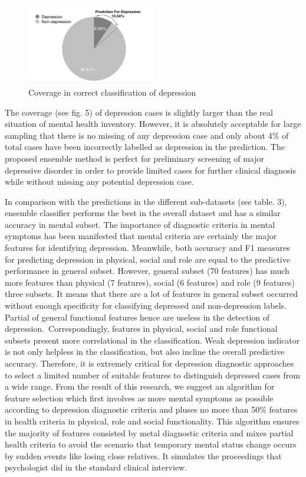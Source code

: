 \documentclass[10pt,journal,compsoc]{IEEEtran}
\begin{document}
\begin{figure}[h]
\includegraphics[width=0.5\textwidth]{coverage.png}
\caption{Coverage in correct classification of depression} \label{fig5}
\end{figure}
The coverage (see fig. 5) of depression cases is slightly larger than the real situation of mental health inventory. However, it is absolutely acceptable for large sampling that there is no missing of any depression case and only about 4\% of total cases have been incorrectly labelled as depression in the prediction. The proposed ensemble method is perfect for preliminary screening of major depressive disorder in order to provide limited cases for further clinical diagnosis while without missing any potential depression case. 

In comparison with the predictions in the different sub-datasets (see table. 3), ensemble classifier performs the best in the overall dataset and has a similar accuracy in mental subset. The importance of diagnostic criteria in mental symptoms has been manifested that mental criteria are certainly the major features for identifying depression. Meanwhile, both accuracy and F1 measures for predicting depression in physical, social and role are equal to the predictive performance in general subset. However, general subset (70 features) has much more features than physical (7 features), social (6 features) and role (9 features) three subsets. It means that there are a lot of features in general subset occurred without enough specificity for classifying depressed and non-depression labels. Partial of general functional features hence are useless in the detection of depression. Correspondingly, features in physical, social and role functional subsets present more correlational in the classification. Weak depression indicator is not only helpless in the classification, but also incline the overall predictive accuracy. Therefore, it is extremely critical for depression diagnostic approaches to select a limited number of suitable features to distinguish depressed cases from a wide range. From the result of this research, we suggest an algorithm for feature selection which first involves as more mental symptoms as possible according to depression diagnostic criteria and pluses no more than 50\% features in health criteria in physical, role and social functionality. This algorithm ensures the majority of features consisted by metal diagnostic criteria and mixes partial health criteria to avoid the scenario that temporary mental status change occurs by sudden events like losing close relatives. It simulates the proceedings that psychologist did in the standard clinical interview. 
\end{document}
